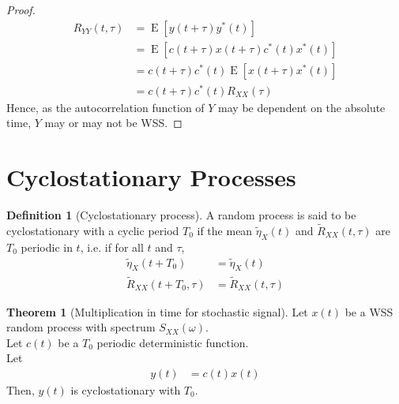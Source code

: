 \documentclass[titlepage, fleqn, a4paper, 12pt, twoside]{article}
\theoremstyle{definition}
\newtheorem{definition}{Definition}
\theoremstyle{theorem}
\newtheorem{theorem}{Theorem}
\renewcommand{\tilde}{\widetilde}
\DeclareMathOperator{\expct}{\mathrm{E}}
\begin{document}
\begin{proof}
	\begin{align*}
		R_{Y Y}(t,\tau) &= \expct\left[ y(t + \tau) y^*(t) \right]\\
		&= \expct\left[ c(t + \tau) x(t + \tau) c^*(t) x^*(t) \right]\\
		&= c(t + \tau) c^*(t) \expct\left[ x(t + \tau) x^*(t) \right]\\
		&= c(t + \tau) c^*(t) R_{X X}(\tau)
	\end{align*}
	Hence, as the autocorrelation function of $Y$ may be dependent on the absolute time, $Y$ may or may not be WSS.
\end{proof}

\section{Cyclostationary Processes}

\begin{definition}[Cyclostationary process]
	A random process is said to be cyclostationary with a cyclic period $T_0$ if the mean $\tilde{\eta}_X(t)$ and $\tilde{R}_{X X}(t,\tau)$ are $T_0$ periodic in $t$, i.e. if for all $t$ and $\tau$,
	\begin{align*}
		\tilde{\eta}_X(t + T_0) &= \tilde{\eta}_X(t)\\
		\tilde{R}_{X X}(t + T_0,\tau) &= \tilde{R}_{X X}(t,\tau)
	\end{align*}
\end{definition}

\begin{theorem}[Multiplication in time for stochastic signal]
	Let $x(t)$ be a WSS random process with spectrum $S_{X X}(\omega)$.\\
	Let $c(t)$ be a $T_0$ periodic deterministic function.\\
	Let
	\begin{align*}
		y(t) &= c(t) x(t)
	\end{align*}
	Then, $y(t)$ is cyclostationary with $T_0$.
	\label{thm:multiplication_in_time_for_stochastic_signal_and_periodic_deterministic_signal}
\end{theorem}
\end{document}
